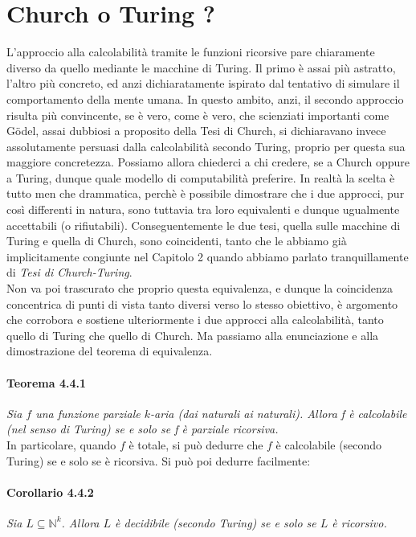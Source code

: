 \section{Church o Turing ?}

L'approccio alla calcolabilità tramite le funzioni ricorsive pare chiaramente
diverso da quello mediante le macchine di Turing. Il primo è assai più astratto,
l'altro più concreto, ed anzi dichiaratamente ispirato dal tentativo di simulare
il comportamento della mente umana. In questo ambito, anzi, il secondo approccio
risulta più convincente, se è vero, come è vero, che scienziati importanti come
Gödel, assai dubbiosi a proposito della Tesi di Church, si dichiaravano invece
assolutamente persuasi dalla calcolabilità secondo Turing, proprio per questa
sua maggiore concretezza. Possiamo allora chiederci a chi credere, se a Church
oppure a Turing, dunque quale modello di computabilità preferire. In realtà la
scelta è tutto men che drammatica, perchè è possibile dimostrare che
$\mathrm{i}$ due approcci, pur così differenti in natura, sono tuttavia tra loro
equivalenti e dunque ugualmente accettabili (o rifiutabili). Conseguentemente le
due tesi, quella sulle macchine di Turing e quella di Church, sono coincidenti,
tanto che le abbiamo già implicitamente congiunte nel Capitolo 2 quando abbiamo
parlato tranquillamente di \textit{Tesi di Church-Turing}.\\
Non va poi trascurato che
proprio questa equivalenza, e dunque la coincidenza concentrica di punti di
vista tanto diversi verso lo stesso obiettivo, è argomento che corrobora e
sostiene ulteriormente i due approcci alla calcolabilità, tanto quello di Turing
che quello di Church. Ma passiamo alla enunciazione e alla dimostrazione del
teorema di equivalenza.

\paragraph{Teorema 4.4.1} \textit{Sia $f$ una funzione parziale $k$-aria (dai naturali ai naturali).
    Allora f è calcolabile (nel senso di Turing) se e solo se f è parziale
    ricorsiva.}\\

In particolare, quando $f$ è totale, si può dedurre che $f$ è calcolabile
(secondo Turing) se e solo se è ricorsiva. Si può poi dedurre facilmente:

\paragraph{Corollario 4.4.2} \textit{Sia $L \subseteq \mathbb{N}^{k}$. Allora $L$ è
    decidibile (secondo Turing) se e solo se $L$ è ricorsivo.}\\

